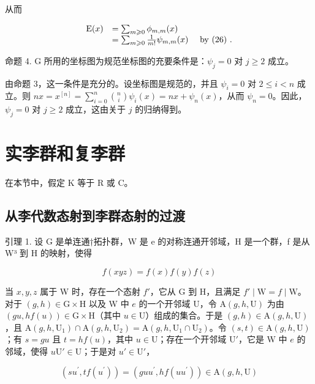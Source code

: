 从而

\[
\begin{array}{r l} \mathrm{E} (x) & = \sum_ {m \geqslant 0} \phi_ {m, m} (x) \\ & = \sum_ {m \geqslant 0} \frac {1}{m !} \psi_ {m, m} (x) \quad \text { by   (26) }. \end{array}
\]

命题 4. G 所用的坐标图为规范坐标图的充要条件是：\(\psi_j = 0\) 对 \(j \geqslant 2\) 成立。

由命题 3，这一条件是充分的。设坐标图是规范的，并且 \(\psi_{i} = 0\) 对 \(2 \leqslant i < n\) 成立。则 \(nx = x^{[n]} = \sum_{i=0}^{n} \binom{n}{i} \psi_{i}(x) = nx + \psi_{n}(x)\)，从而 \(\psi_{n} = 0\)。因此，\(\psi_{j} = 0\) 对 \(j \geqslant 2\) 成立，这由关于 \(j\) 的归纳得到。

\section{实李群和复李群}

在本节中，假定 K 等于 R 或 C。

\subsection{从李代数态射到李群态射的过渡}

引理 1. 设 G 是单连通†拓扑群，W 是 e 的对称连通开邻域，H 是一个群，f 是从 W³ 到 H 的映射，使得

\[
f (x y z) = f (x) f (y) f (z)
\]

当 \(x, y, z\) 属于 W 时，存在一个态射 \(f'\)，它从 G 到 H，且满足 \(f' \mid \mathrm{W} = f \mid \mathrm{W}\)。对于 \((g, h) \in \mathrm{G} \times \mathrm{H}\) 以及 W 中 \(e\) 的一个开邻域 U，令 \(\mathrm{A}(g, h, \mathrm{U})\) 为由 \((gu, hf(u)) \in \mathrm{G} \times \mathrm{H}\)（其中 \(u \in \mathrm{U}\)）组成的集合。于是 \((g, h) \in \mathrm{A}(g, h, \mathrm{U})\)，且 \(\mathrm{A}(g, h, \mathrm{U}_1) \cap \mathrm{A}(g, h, \mathrm{U}_2) = \mathrm{A}(g, h, \mathrm{U}_1 \cap \mathrm{U}_2)\)。令 \((s, t) \in \mathrm{A}(g, h, \mathrm{U})\)；有 \(s = gu\) 且 \(t = hf(u)\)，其中 \(u \in \mathrm{U}\)；存在一个开邻域 \(\mathrm{U}'\)，它是 W 中 \(e\) 的邻域，使得 \(u\mathrm{U}' \in \mathrm{U}\)；于是对 \(u' \in \mathrm{U}'\)，

\[
(s u ^ {\prime}, t f (u ^ {\prime})) = (g u u ^ {\prime}, h f (u u ^ {\prime})) \in \mathrm{A} (g, h, \mathrm{U})
\]


